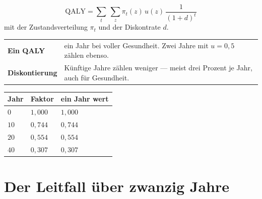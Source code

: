 \begin{merksatz}
\[ \text{QALY} = \sum_{t} \ \sum_{z} \pi_t(z)\,u(z)\,\frac{1}{(1+d)^{t}} \]
mit der Zustandsverteilung $\pi_t$ und der Diskontrate $d$.

\begin{center}
{\small
\renewcommand{\arraystretch}{1.52}
\begin{tabular}{@{}P{2.4cm}P{6.2cm}@{}}
\toprule
\textbf{Ein QALY} & ein Jahr bei voller Gesundheit. Zwei Jahre mit $u = 0{,}5$ zählen ebenso.\\
\textbf{Diskontierung} & Künftige Jahre zählen weniger --- meist drei Prozent je Jahr, auch für Gesundheit.\\
\bottomrule
\end{tabular}}
\end{center}

\begin{center}
\begin{minipage}{0.88\textwidth}
\end{minipage}
\end{center}

\begin{center}
{\small
\renewcommand{\arraystretch}{1.46}
\begin{tabular}{@{}P{2.2cm}P{2.0cm}P{2.4cm}@{}}
\toprule
\textbf{Jahr} & \textbf{Faktor} & \textbf{ein Jahr wert}\\
\midrule
$0$ & $1{,}000$ & $1{,}000$\\
$10$ & $0{,}744$ & $0{,}744$\\
$20$ & $0{,}554$ & $0{,}554$\\
$40$ & $0{,}307$ & $0{,}307$\\
\bottomrule
\end{tabular}}
\end{center}
\end{merksatz}

\section{Der Leitfall über zwanzig Jahre}

